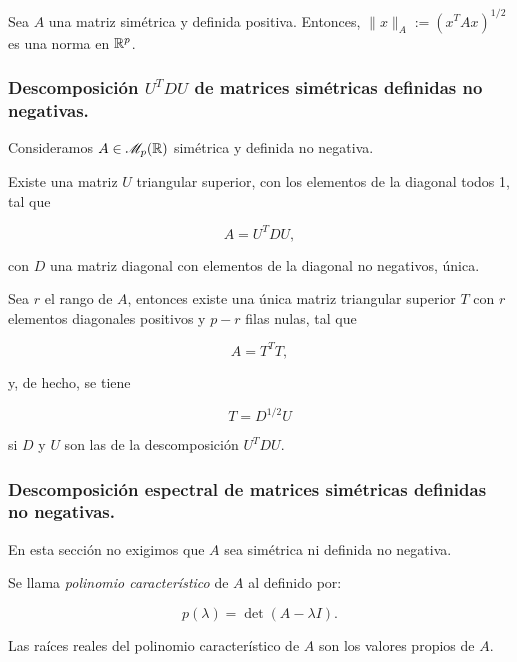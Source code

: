 \begin{nprop}
  Sea $A$ una matriz simétrica y definida positiva. Entonces, $\|x\|_A := (x^TAx)^{1/2}$ es una norma en $\mathbb{R}^p$.
\end{nprop}

\subsubsection{Descomposición $U^TDU$ de matrices simétricas definidas no negativas.}

Consideramos $A\in \mathscr{M}_p(\mathbb{R})$ simétrica y definida no negativa.

\begin{nth}
  Existe una matriz $U$ triangular superior, con los elementos de la diagonal todos 1,
  tal que

  \[ A = U^TDU, \]

  con $D$ una matriz diagonal con elementos de la diagonal no negativos, única.
\end{nth}

\begin{ncor}
  Sea $r$ el rango de $A$, entonces existe una única matriz triangular superior $T$
  con $r$ elementos diagonales positivos y $p-r$ filas nulas, tal que

  \[ A = T^TT, \]

  y, de hecho, se tiene

  \[ T = D^{1/2}U \]

  si $D$ y $U$ son las de la descomposición $U^TDU$.
\end{ncor}

\subsubsection{Descomposición espectral de matrices simétricas definidas no negativas.}

En esta sección no exigimos que $A$ sea simétrica ni definida no negativa.

\begin{ndef}
  Se llama \emph{polinomio característico} de $A$ al definido por:

  \[
    p(\lambda) = \det(A - \lambda I)
  .\] 
\end{ndef}

\begin{nprop}
  Las raíces reales del polinomio característico de $A$ son los valores propios de $A$.
\end{nprop}

